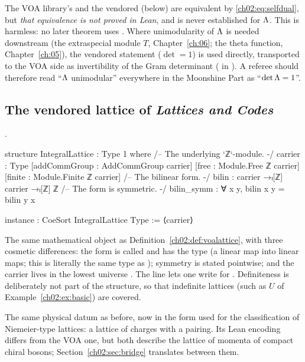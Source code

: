 \begin{warning}[title={Trap: \lean{SelfDual} is never connected to the Leech lattice}]
The VOA library's  and the vendored  (below) are equivalent by
\eqref{ch02:eq:selfdual}, but \emph{that equivalence is not proved in Lean}, and
 is never established for ${\Lambda}$.  This is harmless: no later theorem uses
.  Where unimodularity of ${\Lambda}$ is needed downstream (the
extraspecial module $T$, Chapter~\ref{ch:06}; the theta function, Chapter~\ref{ch:05}), the
vendored statement  ($\det=1$) is used directly, transported to
the VOA side as invertibility of the Gram determinant (
in ).  A referee should therefore read ``${\Lambda}$
unimodular'' everywhere in the Moonshine Part as ``$\det{\Lambda}=1$''.
\end{warning}

\subsection{The vendored lattice of \emph{Lattices and Codes}}\label{ch02:sec:ebelinglattice}

\begin{definition}\label{ch02:def:ebelattice}
.
\end{definition}
\begin{leancode}
structure IntegralLattice : Type 1 where
  /-- The underlying `ℤ`-module. -/
  carrier : Type
  [addCommGroup : AddCommGroup carrier]
  [free : Module.Free ℤ carrier]
  [finite : Module.Finite ℤ carrier]
  /-- The bilinear form. -/
  bilin : carrier →ₗ[ℤ] carrier →ₗ[ℤ] ℤ
  /-- The form is symmetric. -/
  bilin_symm : ∀ x y, bilin x y = bilin y x

instance : CoeSort IntegralLattice Type := ⟨carrier⟩
\end{leancode}
\begin{dictionary}
The same mathematical object as Definition~\ref{ch02:def:voalattice}, with three cosmetic
differences: the form is called  and has the type 
(a linear map into linear maps; this is literally the same type as
); symmetry is stated pointwise; and the carrier lives in
the lowest universe .  The  line lets one write  for
.  Definiteness is deliberately not part of the structure, so that
indefinite lattices (such as $U$ of Example~\ref{ch02:ex:basic}) are covered.
\end{dictionary}
\begin{physics}
The same physical datum as before, now in the form used for the classification of Niemeier-type lattices: a lattice of charges with a pairing. Its Lean encoding differs from the VOA one, but both describe the lattice of momenta of compact chiral bosons; Section~\ref{ch02:sec:bridge} translates between them.
\end{physics}

